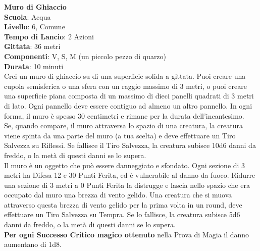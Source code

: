\begin{multicols}{2}
\medskip\textbf{Muro di Ghiaccio}\\
\textbf{Scuola}: Acqua\\
\textbf{Livello}: 6, Comune\\
\textbf{Tempo di Lancio}: 2 Azioni\\
\textbf{Gittata}: 36 metri\\
\textbf{Componenti}: V, S, M (un piccolo pezzo di quarzo)\\
\textbf{Durata}: 10 minuti\\
Crei un muro di ghiaccio su di una superficie solida a gittata. Puoi creare una cupola semisferica o una sfera con un raggio massimo di 3 metri, o puoi creare una superficie piana composta di un massimo di dieci panelli quadrati di 3 metri di lato. Ogni pannello deve essere contiguo ad almeno un altro pannello. In ogni forma, il muro è spesso 30 centimetri e rimane per la durata dell'incantesimo. \\
Se, quando compare, il muro attraversa lo spazio di una creatura, la creatura viene spinta da una parte del muro (a tua scelta) e deve effettuare un Tiro Salvezza su Riflessi. Se fallisce il Tiro Salvezza, la creatura subisce 10d6 danni da freddo, o la metà di questi danni se lo supera.\\
Il muro è un oggetto che può essere danneggiato e sfondato. Ogni sezione di 3 metri ha Difesa 12 e 30 Punti Ferita, ed è vulnerabile al danno da fuoco. Ridurre una sezione di 3 metri a 0 Punti Ferita la distrugge e lascia nello spazio che era occupato dal muro una brezza di vento gelido. Una creatura che si muova attraverso questa brezza di vento gelido per la prima volta in un round, deve effettuare un Tiro Salvezza su Tempra. Se lo fallisce, la creatura subisce 5d6 danni da freddo, o la metà di questi danni se lo supera.\\
\textbf{Per ogni Successo Critico magico ottenuto} nella Prova di Magia il danno aumentano di 1d8.


\end{multicols}
